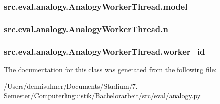 \subsubsection[{\texorpdfstring{model}{model}}]{\setlength{\rightskip}{0pt plus 5cm}src.\+eval.\+analogy.\+Analogy\+Worker\+Thread.\+model}\hypertarget{classsrc_1_1eval_1_1analogy_1_1_analogy_worker_thread_aab57ebb5a41ee124300ac2125083bf3d}{}\label{classsrc_1_1eval_1_1analogy_1_1_analogy_worker_thread_aab57ebb5a41ee124300ac2125083bf3d}
\subsubsection[{\texorpdfstring{n}{n}}]{\setlength{\rightskip}{0pt plus 5cm}src.\+eval.\+analogy.\+Analogy\+Worker\+Thread.\+n}\hypertarget{classsrc_1_1eval_1_1analogy_1_1_analogy_worker_thread_a8d27081ea882e7a4ad24d760a16529d8}{}\label{classsrc_1_1eval_1_1analogy_1_1_analogy_worker_thread_a8d27081ea882e7a4ad24d760a16529d8}
\subsubsection[{\texorpdfstring{worker\+\_\+id}{worker\_id}}]{\setlength{\rightskip}{0pt plus 5cm}src.\+eval.\+analogy.\+Analogy\+Worker\+Thread.\+worker\+\_\+id}\hypertarget{classsrc_1_1eval_1_1analogy_1_1_analogy_worker_thread_a8b2c2720d9c294ddc0b020ad64174e6f}{}\label{classsrc_1_1eval_1_1analogy_1_1_analogy_worker_thread_a8b2c2720d9c294ddc0b020ad64174e6f}


The documentation for this class was generated from the following file\+:\begin{DoxyCompactItemize}
\item 
/\+Users/dennisulmer/\+Documents/\+Studium/7. Semester/\+Computerlinguistik/\+Bachelorarbeit/src/eval/\hyperlink{analogy_8py}{analogy.\+py}\end{DoxyCompactItemize}
